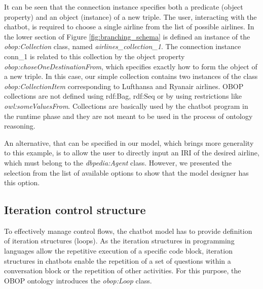 \documentclass[runningheads]{llncs}
\begin{document}
It can be seen that the connection instance specifies both a predicate (object property) and an object (instance) of a new triple. The user, interacting with the chatbot, is required to choose a single airline from the list of possible airlines. In the lower section of Figure \ref{fig:branching_schema} is defined an instance of the \textit{obop:Collection} class, named \textit{airlines\_collection\_1}. The connection instance conn\_1 is related to this collection by the object property \textit{obop:choseOneDestinationFrom}, which specifies exactly how to form the object of a new triple. In this case, our simple collection contains two instances of the class \textit{obop:CollectionItem} corresponding to Lufthansa and Ryanair airlines. 
OBOP collections are not defined using rdf:Bag, rdf:Seq or by using restrictions like \textit{owl:someValuesFrom}. Collections are basically used by the chatbot program in the runtime phase and they are not meant to be used in the process of ontology reasoning.     

An alternative, that can be specified in our model, which brings more generality to this example,  is to allow the user to directly input an IRI of the desired airline, which must belong to the \textit{dbpedia:Agent} class. However, we presented the selection from the list of available options to show that the model designer has this option.

\FloatBarrier 
\subsection {Iteration control structure}
To effectively manage control flows, the chatbot model has to provide definition of iteration structures (loops). As the iteration structures in programming languages allow the repetitive execution of a specific code block, iteration structures in chatbots enable the repetition of a set of questions within a conversation block or the repetition of other activities. For this purpose, the OBOP ontology introduces the \textit{obop:Loop} class. 
\end{document}
